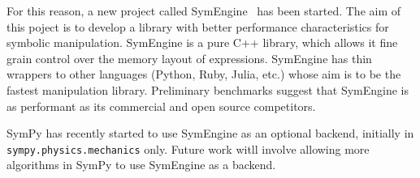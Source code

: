 For this reason, a new project called SymEngine~\cite{SymEngine} has been started.
The aim of this poject is to develop a library with better performance
characteristics for symbolic manipulation. SymEngine is a pure C++ library,
which allows it fine grain control over the memory layout of expressions.
SymEngine has thin wrappers to other languages (Python, Ruby,
Julia, etc.) whose aim is to be the fastest manipulation library. Preliminary
benchmarks suggest that SymEngine is as performant as its commercial and
open source competitors.

SymPy has recently started to use SymEngine as an
optional backend, initially in \texttt{sympy.physics.mechanics} only.
Future work witll involve
allowing more algorithms in SymPy to use SymEngine as a backend.
